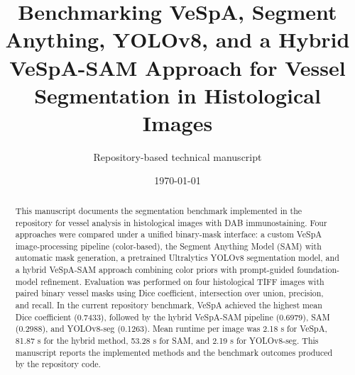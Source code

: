 \documentclass[11pt]{article}
\title{Benchmarking VeSpA, Segment Anything, YOLOv8, and a Hybrid VeSpA-SAM Approach for Vessel Segmentation in Histological Images}
\author{Repository-based technical manuscript}
\date{\today}
\begin{document}
\maketitle

\begin{abstract}
This manuscript documents the segmentation benchmark implemented in the repository for vessel analysis in histological images with DAB immunostaining. Four approaches were compared under a unified binary-mask interface: a custom VeSpA image-processing pipeline (color-based), the Segment Anything Model (SAM) with automatic mask generation, a pretrained Ultralytics YOLOv8 segmentation model, and a hybrid VeSpA-SAM approach combining color priors with prompt-guided foundation-model refinement. Evaluation was performed on four histological TIFF images with paired binary vessel masks using Dice coefficient, intersection over union, precision, and recall. In the current repository benchmark, VeSpA achieved the highest mean Dice coefficient (0.7433), followed by the hybrid VeSpA-SAM pipeline (0.6979), SAM (0.2988), and YOLOv8-seg (0.1263). Mean runtime per image was 2.18 s for VeSpA, 81.87 s for the hybrid method, 53.28 s for SAM, and 2.19 s for YOLOv8-seg. This manuscript reports the implemented methods and the benchmark outcomes produced by the repository code.
\end{abstract}








\end{document}
